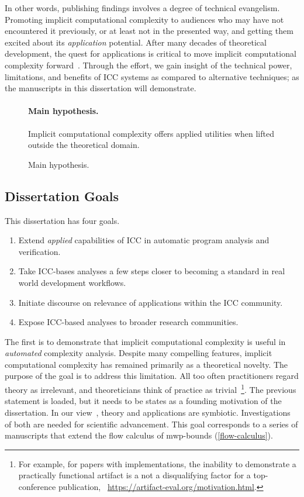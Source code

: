 In other words, publishing findings involves a degree of technical evangelism.
Promoting implicit computational complexity to audiences who may have not encountered it previously, or at least not in the presented way, and getting them excited about its \emph{application} potential.
After many decades of theoretical development, the quest for applications is critical to move implicit computational complexity forward~\cite[p.~7]{moyen2017}.
Through the effort, we gain insight of the technical power, limitations, and benefits of ICC systems as compared to alternative techniques;
as the manuscripts in this dissertation will demonstrate.

\begin{figure}[t]
\begin{mdframed}
\paragraph*{Main hypothesis.}
Implicit computational complexity offers applied utilities when lifted outside the theoretical domain.
\end{mdframed}
\caption[Main hypothesis summarized]{Main hypothesis.}
\label{fig:hypothesis}
\end{figure}

\subsection{Dissertation Goals}\label{subsec:specific-aims}

This dissertation has four goals.

\begin{enumerate}
\item Extend \emph{applied} capabilities of ICC in automatic program analysis and verification.
\item Take ICC-bases analyses a few steps closer to becoming a standard in real world development workflows.
\item Initiate discourse on relevance of applications within the ICC community.
\item Expose ICC-based analyses to broader research communities.
\end{enumerate}

The first is to demonstrate that implicit computational complexity is useful in \emph{automated} complexity analysis.
Despite many compelling features, implicit computational complexity has remained primarily as a theoretical novelty.
The purpose of the goal is to address this limitation.
All too often practitioners regard theory as irrelevant, and theoreticians think of practice as trivial~\cite[pg. xxxv]{bishop2003}\footnote{
For example, for papers with implementations, the inability to demonstrate a practically functional artifact is a not a disqualifying factor for a top-conference publication,
\cf\eg~\url{https://artifact-eval.org/motivation.html}.}.
The previous statement is loaded, but it needs to be states as a founding motivation of the dissertation.
In our view~\cite[p. 75]{moyen2017}, theory and applications are symbiotic.
Investigations of both are needed for scientific advancement.
This goal corresponds to a series of manuscripts that extend the flow calculus of mwp-bounds (\autoref{flow-calculus}).

